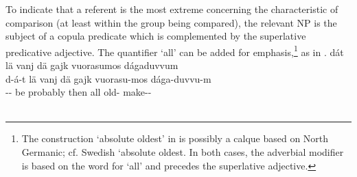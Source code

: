 To indicate that a referent is the most extreme concerning the characteristic of comparison (at least within the group being compared), the relevant NP is the subject of a copula predicate which is complemented by the superlative predicative adjective. The quantifier  ‘all’ can be added for emphasis,\footnote{The construction  ‘absolute oldest’ in  is possibly a calque based on North Germanic; cf. Swedish  ‘absolute oldest. In both cases, the adverbial modifier is based on the word for ‘all’ and precedes the superlative adjective.} 
as in .
\ea\label{comparingNPsEx5}
\glll	dát lä vanj dä gajk vuorasumos dágaduvvum\\
	d-á-t lä vanj dä gajk vuorasu-mos dága-duvvu-m\\
	-- be\BS{} probably then all old-\BS{} make--\\\nopagebreak
{}\\	
\z





